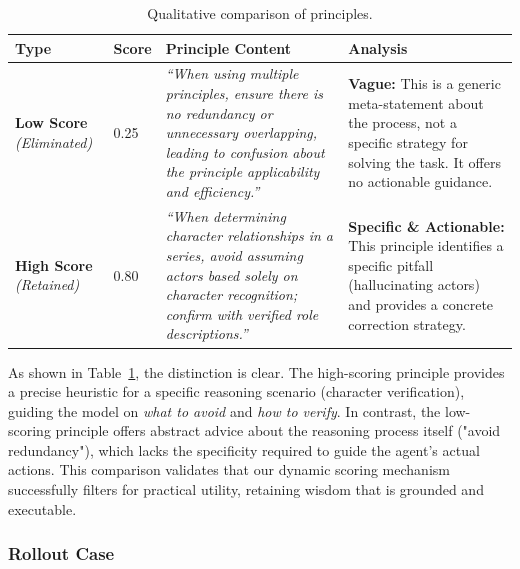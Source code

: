 \begin{table}[h]
    \centering
    \small
    \renewcommand{\arraystretch}{1.5} %
    \renewcommand{\tabularxcolumn}[1]{m{#1}} 
    
    \caption{Qualitative comparison of principles.}
    \label{tab:qualitative_principles}

    \begin{tabularx}{\textwidth}{ m{2.2cm} m{1.2cm}<{\centering} X X }
        \toprule
        \textbf{Type} & \textbf{Score} & \textbf{Principle Content} & \textbf{Analysis} \\
        \midrule
        \textbf{Low Score} \newline \textit{(Eliminated)} & 0.25 & \textit{``When using multiple principles, ensure there is no redundancy or unnecessary overlapping, leading to confusion about the principle applicability and efficiency.''} & \textbf{Vague:} This is a generic meta-statement about the process, not a specific strategy for solving the task. It offers no actionable guidance. \\
        \midrule
        \textbf{High Score} \newline \textit{(Retained)} & 0.80 & \textit{``When determining character relationships in a series, avoid assuming actors based solely on character recognition; confirm with verified role descriptions.''} & \textbf{Specific \& Actionable:} This principle identifies a specific pitfall (hallucinating actors) and provides a concrete correction strategy. \\
        \bottomrule
    \end{tabularx}
\end{table}

As shown in Table~\ref{tab:qualitative_principles}, the distinction is clear. The high-scoring principle provides a precise heuristic for a specific reasoning scenario (character verification), guiding the model on \textit{what to avoid} and \textit{how to verify}. In contrast, the low-scoring principle offers abstract advice about the reasoning process itself ("avoid redundancy"), which lacks the specificity required to guide the agent's actual actions. This comparison validates that our dynamic scoring mechanism successfully filters for practical utility, retaining wisdom that is grounded and executable.



\subsubsection{Rollout Case}

